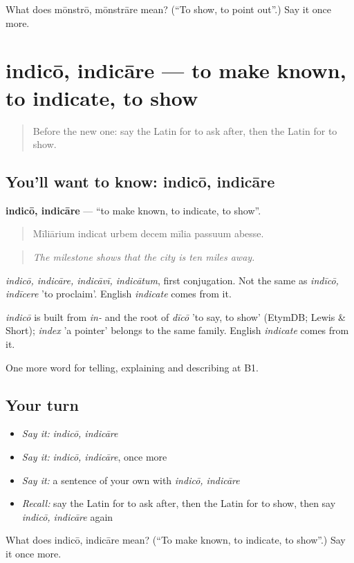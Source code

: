 \begin{tcolorbox}[breakable,colback=teal!4,colframe=teal!35!black,title={Before you move on}]
What does mōnstrō, mōnstrāre mean? (\textquotedblleft{}To show, to point out\textquotedblright{}.) Say it once more.
\end{tcolorbox}
\section[indicō, indicāre]{indicō, indicāre — to make known, to indicate, to show}

\label{lesson:LA-C451-indico}



\begin{quote}
Before the new one: say the Latin for to ask after, then the Latin for to show.
\end{quote}

\subsection*{You'll want to know: indicō, indicāre}
\textbf{indicō, indicāre} — \textquotedblleft{}to make known, to indicate, to show\textquotedblright{}.

\begin{quote}
Mīliārium indicat urbem decem mīlia passuum abesse.
\end{quote}

\begin{quote}
\emph{The milestone shows that the city is ten miles away.}
\end{quote}

\emph{indicō, indicāre, indicāvī, indicātum}, first conjugation. Not the same as \emph{indīcō, indīcere} 'to proclaim'. English \emph{indicate} comes from it.

\begin{cousinweb}
\emph{indicō} is built from \emph{in-} and the root of \emph{dīcō} 'to say, to show' (EtymDB; Lewis \& Short); \emph{index} 'a pointer' belongs to the same family. English \emph{indicate} comes from it.
\end{cousinweb}

\begin{grammarlens}[title={What you've built}]
One more word for telling, explaining and describing at B1.
\end{grammarlens}

\subsection*{Your turn}
\begin{itemize}
\raggedright
  \item \emph{Say it:} \emph{indicō, indicāre}
  \item \emph{Say it:} \emph{indicō, indicāre}, once more
  \item \emph{Say it:} a sentence of your own with \emph{indicō, indicāre}
  \item \emph{Recall:} say the Latin for to ask after, then the Latin for to show, then say \emph{indicō, indicāre} again
\end{itemize}

\begin{tcolorbox}[breakable,colback=teal!4,colframe=teal!35!black,title={Before you move on}]
What does indicō, indicāre mean? (\textquotedblleft{}To make known, to indicate, to show\textquotedblright{}.) Say it once more.
\end{tcolorbox}
